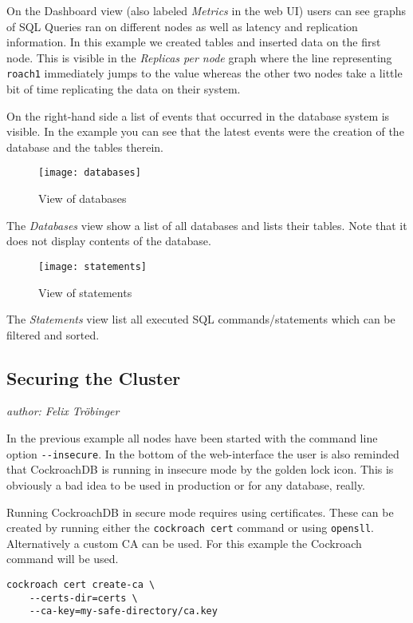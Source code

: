 On the Dashboard view (also labeled \emph{Metrics} in the web UI) users can see graphs of SQL Queries ran on different nodes as well as latency and replication information.
In this example we created tables and inserted data on the first node. This is visible in the \emph{Replicas per node} graph where the line representing \verb|roach1| immediately jumps to the value whereas the other two nodes take a little bit of time replicating the data on their system. 

On the right-hand side a list of events that occurred in the database system is visible. In the example you can see that the latest events were the creation of the database and the tables therein.

\begin{figure}[H]
    \caption{View of databases}
    \texttt{[image: databases]}
    \label{fig:databases}
\end{figure}
The \emph{Databases} view show a list of all databases and lists their tables. Note that it does not display contents of the database.

\begin{figure}[H]
    \caption{View of statements}
    \texttt{[image: statements]}
    \label{fig:statements}
\end{figure}

The \emph{Statements} view list all executed SQL commands/statements which can be filtered and sorted. 

\subsection{Securing the Cluster}\label{chap:secure}
\emph{author: Felix Tröbinger}\bigskip

In the previous example all nodes have been started with the command line option \verb|--insecure|. In the bottom of the web-interface the user is also reminded that CockroachDB is running in insecure mode by the golden lock icon. This is obviously a bad idea to be used in production or for any database, really. 

\medskip
Running CockroachDB in secure mode requires using certificates. These can be created by running either the \verb|cockroach cert| command or using \verb|opensll|. Alternatively a custom CA can be used.\cite{cockroach-cert}
For this example the Cockroach command will be used.

\begin{verbatim}
cockroach cert create-ca \ 
    --certs-dir=certs \
    --ca-key=my-safe-directory/ca.key
\end{verbatim}


